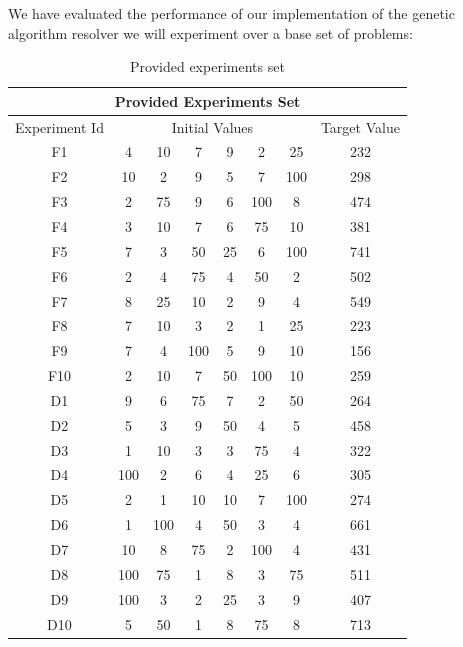 \documentclass[a4paper,10pt,titlepage]{article}
\begin{document}
\par We have evaluated the performance of our implementation of the genetic algorithm resolver we will experiment over a base set of problems:

\begin{table}[H] 
\caption{Provided experiments set} %
\centering 
\begin{tabular}{c c c c c c c c}
			
\multicolumn{8}{c}{\textbf{Provided Experiments Set}} \\
\hline

\multicolumn{1}{c}{Experiment Id}
&\multicolumn{6}{c}{Initial Values}
&\multicolumn{1}{c}{Target Value} \\

\cline{2-7}

F1 & 4 & 10 & 7 & 9 & 2 & 25 & 232 \\
F2 & 10 & 2 & 9 & 5 & 7 & 100 &	298 \\
F3 & 2 & 75 & 9 & 6 & 100 & 8 &	474 \\
F4 & 3 & 10 & 7 & 6 & 75 & 10 &	381 \\
F5 & 7 & 3 & 50 & 25 & 6 & 100 & 741 \\
F6 & 2 & 4 & 75 & 4 & 50 & 2 & 502 \\
F7 & 8 & 25 & 10 & 2 & 9 & 4 & 549 \\
F8 & 7 & 10 & 3 & 2 & 1 & 25 & 223 \\
F9 & 7 & 4 & 100 & 5 & 9 & 10 & 156 \\
F10 & 2 & 10 & 7 & 50 & 100 & 10 & 259 \\
D1 & 9 & 6 & 75 & 7 & 2 & 50 & 264 \\
D2 & 5 & 3 & 9 & 50 & 4 & 5 & 458 \\
D3 & 1 & 10 & 3 & 3 & 75 & 4 & 322 \\
D4 & 100 & 2 & 6 & 4 & 25 & 6 & 305 \\
D5 & 2 & 1 & 10 & 10 & 7 & 100 & 274 \\
D6 & 1 & 100 & 4 & 50 & 3 & 4 & 661 \\
D7 & 10 & 8 & 75 & 2 & 100 & 4 & 431 \\
D8 & 100 & 75 & 1 & 8 & 3 & 75 & 511 \\
D9 & 100 & 3 & 2 & 25 & 3 & 9 &	407 \\
D10 & 5 & 50 & 1 & 8 & 75 & 8 &	713 

\end{tabular} 
\label{tab:dist_result} 
\end{table}
\end{document}
